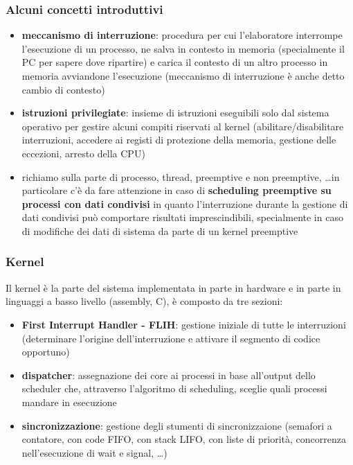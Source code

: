 \documentclass[a4paper]{article}
\begin{document}
\subsubsection*{Alcuni concetti introduttivi}
\begin{itemize}
	\item \textbf{meccanismo di interruzione}: procedura per cui l'elaboratore interrompe l'esecuzione di un processo, ne salva
	in contesto in memoria (specialmente il PC per sapere dove ripartire) e carica il contesto di un altro processo in memoria
	avviandone l'esecuzione (meccanismo di interruzione è anche detto cambio di contesto)
	\item \textbf{istruzioni privilegiate}: insieme di istruzioni eseguibili solo dal sistema operativo per gestire alcuni compiti
	riservati al kernel (abilitare/disabilitare interruzioni, accedere ai registi di protezione della memoria, gestione delle
	eccezioni, arresto della CPU)
	\item richiamo sulla parte di processo, thread, preemptive e non preemptive, \dots in particolare c'è da fare attenzione in
	caso di \textbf{scheduling preemptive su processi con dati condivisi} in quanto l'interruzione durante la gestione di dati
	condivisi può comportare risultati imprescindibili, specialmente in caso di modifiche dei dati di sistema da parte di un
	kernel preemptive
\end{itemize}

\subsubsection*{Kernel}
Il kernel è la parte del sistema implementata in parte in hardware e in parte in linguaggi a basso livello (assembly, C), è
composto da tre sezioni:
\begin{itemize}
	\item \textbf{First Interrupt Handler - FLIH}: gestione iniziale di tutte le interruzioni (determinare l'origine dell'interruzione
	e attivare il segmento di codice opportuno)
	\item \textbf{dispatcher}: assegnazione dei core ai processi in base all'output dello scheduler che, attraverso l'algoritmo
	di scheduling, sceglie quali processi mandare in esecuzione
	\item \textbf{sincronizzazione}: gestione degli stumenti di sincronizzaione (semafori a contatore, con code FIFO, con stack
	LIFO, con liste di priorità, concorrenza nell'esecuzione di wait e signal, \dots)
\end{itemize}
\end{document}
